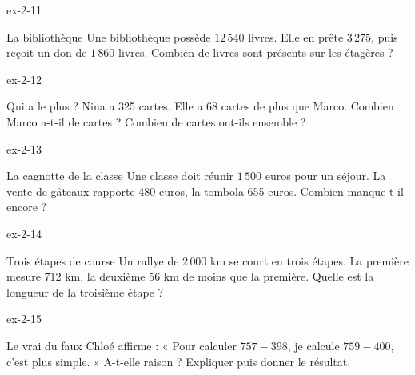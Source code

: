 \begin{blocLivre}{ex-2-11}\begin{exercice}[3]{La bibliothèque}
Une bibliothèque possède $12\,540$ livres. Elle en prête $3\,275$, puis reçoit un don de $1\,860$ livres. Combien de livres sont présents sur les étagères ?
\end{exercice}\end{blocLivre}
\begin{blocLivre}{ex-2-12}\begin{exercice}[3]{Qui a le plus ?}
Nina a 325 cartes. Elle a 68 cartes de plus que Marco. Combien Marco a-t-il de cartes ? Combien de cartes ont-ils ensemble ?
\label{fig-ex-2-12}
\end{exercice}\end{blocLivre}
\begin{blocLivre}{ex-2-13}\begin{exercice}[3]{La cagnotte de la classe}
Une classe doit réunir $1\,500$ euros pour un séjour. La vente de gâteaux rapporte 480 euros, la tombola 655 euros. Combien manque-t-il encore ?
\end{exercice}\end{blocLivre}
\begin{blocLivre}{ex-2-14}\begin{exercice}[3]{Trois étapes de course}
Un rallye de $2\,000$ km se court en trois étapes. La première mesure 712 km, la deuxième 56 km de moins que la première. Quelle est la longueur de la troisième étape ?
\end{exercice}\end{blocLivre}
\begin{blocLivre}{ex-2-15}\begin{exercice}[3]{Le vrai du faux}
Chloé affirme : « Pour calculer $757-398$, je calcule $759-400$, c’est plus simple. » A-t-elle raison ? Expliquer puis donner le résultat.
\end{exercice}\end{blocLivre}

\clearpage
